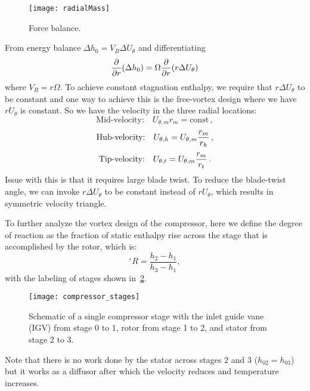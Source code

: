 \begin{figure}[!htb!]
 \centering
    {\texttt{[image: radialMass]}}
    \caption{\label{fig:radial_mass}Force balance.}
\end{figure}

From energy balance $\Delta h_0 = V_B \Delta U_\theta$ and differentiating
\begin{equation}
  {\frac{\partial}{\partial r}} (\Delta h_0) = \Omega {\frac{\partial}{\partial r}} (r \Delta U_\theta)
\end{equation}
where $V_B = r \Omega$. To achieve constant stagnation enthalpy, we require that $r\Delta U_\theta$ to be constant and one way to achieve this is the free-vortex design where we have $r U_\theta$ is constant. So we have the velocity in the three radial locations:
\begin{equation}
  \text{Mid-velocity:} \quad U_{\theta, m} r_m = \text{const}\,,
\end{equation}
\begin{equation}
  \text{Hub-velocity:} \quad U_{\theta, h} = U_{\theta, m} {\frac{r_m}{r_h}}\,,
\end{equation}
\begin{equation}
  \text{Tip-velocity:} \quad U_{\theta, t} = U_{\theta, m} {\frac{r_m}{r_t}}\,.
\end{equation}
Issue with this is that it requires large blade twist. To reduce the blade-twist angle, we can invoke $r \Delta U_\theta$ to be constant instead of $r U_\theta$, which results in symmetric velocity triangle.

To further analyze the vortex design of the compressor, here we define the degree of reaction as the fraction of static enthalpy rise across the stage that is accomplished by the rotor, which is:
\begin{equation}
	^\circ R = \frac{h_2 - h_1}{h_3 - h_1},
\end{equation}
with the labeling of stages shown in~\cref{fig:compressor_stages}.
\begin{figure}
	\centering
	\texttt{[image: compressor\_stages]}
	\caption{Schematic of a single compressor stage with the inlet guide vane (IGV) from stage 0 to 1, rotor from stage 1 to 2, and stator from stage 2 to 3.}
	\label{fig:compressor_stages}
\end{figure}
Note that there is no work done by the stator across stages $2$ and $3$ ($h_{02} = h_{03}$) but it works as a diffusor after which the velocity reduces and temperature increases.

